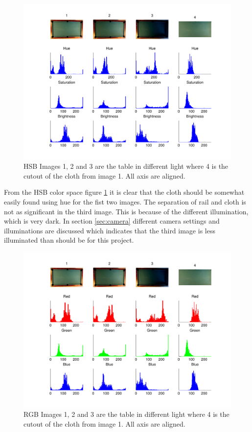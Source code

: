 \begin{figure}[htpb]
\begin{center}
\leavevmode
\includegraphics[width=1\textwidth]{images/hsv_hist_table}
\end{center}
\caption{HSB Images 1, 2 and 3 are the table in different light where 4 is the cutout of the cloth from image 1. All axis are aligned.}
\label{fig:tablehsv}
\end{figure}
From the HSB color space figure \ref{fig:tablehsv} it is clear that the cloth should be somewhat easily found using hue for the fist two images. The separation of rail and cloth is not as significant in the third image. This is because of the different illumination, which is very dark. In section \ref{sec:camera} different camera settings and illuminations are discussed which indicates that the third image is less illuminated than should be for this project.
\begin{figure}[htpb]
\begin{center}
\leavevmode
\includegraphics[width=1\textwidth]{images/rgb_hist_table}
\end{center}
\caption{RGB Images 1, 2 and 3 are the table in different light where 4 is the cutout of the cloth from image 1. All axis are aligned.}
\label{fig:tablergb}
\end{figure}
